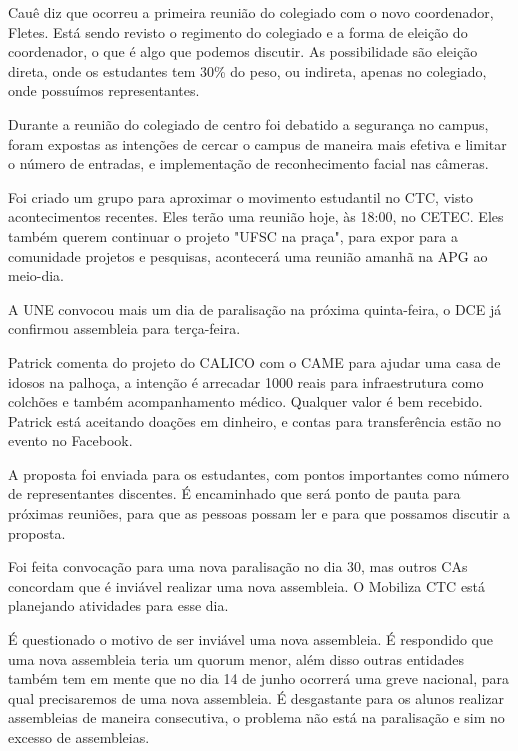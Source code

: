 \documentclass{ata-calico}
\begin{document}
\maketitle

Cauê diz que ocorreu a primeira reunião do colegiado com o novo coordenador, Fletes. Está sendo revisto o regimento do colegiado e a forma de eleição do coordenador, o que é algo que podemos discutir. As possibilidade são eleição direta, onde os estudantes tem 30\% do peso, ou indireta, apenas no colegiado, onde possuímos representantes.

Durante a reunião do colegiado de centro foi debatido a segurança no campus, foram expostas as intenções de cercar o campus de maneira mais efetiva e limitar o número de entradas, e implementação de reconhecimento facial nas câmeras.

Foi criado um grupo para aproximar o movimento estudantil no CTC, visto acontecimentos recentes. Eles terão uma reunião hoje, às 18:00, no CETEC. Eles também querem continuar o projeto "UFSC na praça", para expor para a comunidade projetos e pesquisas, acontecerá uma reunião amanhã na APG ao meio-dia.

A UNE convocou mais um dia de paralisação na próxima quinta-feira, o DCE já confirmou assembleia para terça-feira.

Patrick comenta do projeto do CALICO com o CAME para ajudar uma casa de idosos na palhoça, a intenção é arrecadar 1000 reais para infraestrutura como colchões e também acompanhamento médico. Qualquer valor é bem recebido. Patrick está aceitando doações em dinheiro, e contas para transferência estão no evento no Facebook.

A proposta foi enviada para os estudantes, com pontos importantes como número de representantes discentes.
\bigbreak
É encaminhado que será ponto de pauta para próximas reuniões, para que as pessoas possam ler e para que possamos discutir a proposta.

Foi feita convocação para uma nova paralisação no dia 30, mas outros CAs concordam que é inviável realizar uma nova assembleia. O Mobiliza CTC está planejando atividades para esse dia.

É questionado o motivo de ser inviável uma nova assembleia. É respondido que uma nova assembleia teria um quorum menor, além disso outras entidades também tem em mente que no dia 14 de junho ocorrerá uma greve nacional, para qual precisaremos de uma nova assembleia. É desgastante para os alunos realizar assembleias de maneira consecutiva, o problema não está na paralisação e sim no excesso de assembleias.
\end{document}
